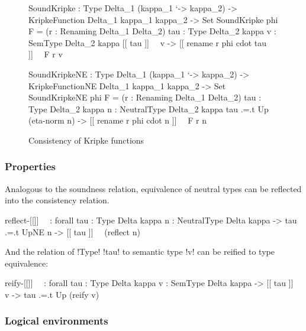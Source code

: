 \documentclass[sigplan,10pt,anonymous,review]{acmart}\settopmatter{printfolios=true,printccs=false,printacmref=false}
\begin{document}
\begin{figure}
\begin{agda}
SoundKripke : Type Delta_1 (kappa_1 `-> kappa_2) -> 
              KripkeFunction Delta_1  kappa_1  kappa_2 -> Set 
SoundKripke phi F = 
  (r : Renaming Delta_1  Delta_2) 
  {tau : Type Delta_2 kappa} {v : SemType Delta_2 kappa}
  [[ tau ]]~~ v -> 
  [[ rename r phi cdot tau ]]~~ F r v

SoundKripkeNE : Type Delta_1 (kappa_1 `-> kappa_2) -> 
                KripkeFunctionNE Delta_1  kappa_1  kappa_2 -> Set
SoundKripkeNE phi F = 
  (r : Renaming Delta_1  Delta_2) 
  {tau : Type Delta_2 kappa} {n : NeutralType Delta_2 kappa}
  tau .=.t Up (eta-norm n) -> 
  [[ rename r phi cdot n ]]~~ F r n
\end{agda}
\caption{Consistency of Kripke functions}
\label{fig:soundKripke}
\end{figure}
 
\subsubsection{Properties}

Analogous to the soundness relation, equivalence of neutral types can be reflected into the consistency relation.

\begin{agda}
reflect-[[]]~~ : forall {tau : Type Delta kappa} 
                 {n : NeutralType Delta kappa} -> 
                 tau .=.t UpNE n  -> [[ tau ]]~~ (reflect n)
\end{agda}

\Ni And the relation of !Type! !tau! to semantic type !v! can be reified to type equivalence: 

\begin{agda}
reify-[[]]~~ : forall {tau : Type Delta kappa}
               {v : SemType Delta kappa} -> 
               [[ tau ]]~~ v -> 
               tau .=.t Up (reify v)
\end{agda}



\subsubsection{Logical environments}
\end{document}
